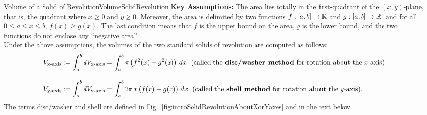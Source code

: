 \begin{propColor}{Volume of a Solid of Revolution}{VolumeSolidRevolution}
\textbf{Key Assumptions:} The area lies totally in the first-quadrant of the $(x, y)$-plane, that is, the quadrant where $x\ge 0$ and $y \ge 0$. Moreover, the area is delimited by two functions $f:[a, b] \to \mathbb R$ and $g:[a, b] \to \mathbb R$, and for all $0\le a \le x \le b$, $f(x) \ge g(x)$. The last condition means that $f$ is the upper bound on the area, $g$ is the lower bound, and the two functions do not enclose any ``negative area''. \\

Under the above assumptions, the volumes of the two standard solids of revolution are computed as follows:
\begin{align}
\label{eq:Vx}
       V_{\rm x{\text{-axis}}} &:=  \int_a^b  dV_{\rm x{\text{-axis}}} = \int_a^b \pi \left( f^2(x) - g^2(x)\right)\,dx ~~(\text{called the {\bf disc/washer method} for rotation about the $x$-axis})\\[1em]
\label{eq:Vy}
         V_{\rm y{\text{-axis}}} &:=\int_a^b  dV_{\rm y{\text{-axis}}} = \int_a^b 2 \pi \, x \left( f(x) - g(x)\right)\,dx ~~(\text{called the {\bf shell method} for rotation about the $y$-axis}).
\end{align}
The terms disc/washer and shell are defined in Fig.~\ref{fig:introSolidRevolutionAboutXorYaxes} and in the text below.  \\


\end{propColor}

\bigskip

